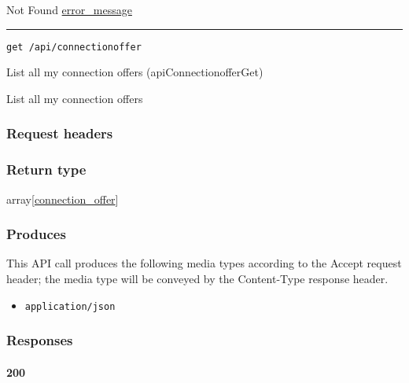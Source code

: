 Not Found \protect\hyperlink{error_message}{error\_message}

\begin{center}\rule{0.5\linewidth}{\linethickness}\end{center}

\protect\hypertarget{apiConnectionofferGet}{}{}

\begin{verbatim}
get /api/connectionoffer
\end{verbatim}

List all my connection offers ({apiConnectionofferGet})

List all my connection offers

\hypertarget{request-headers-83}{%
\subsubsection{Request headers}\label{request-headers-83}}

\hypertarget{return-type-119}{%
\subsubsection{Return type}\label{return-type-119}}

array{[}\protect\hyperlink{connection_offer}{connection\_offer}{]}

\hypertarget{produces-152}{%
\subsubsection{Produces}\label{produces-152}}

This API call produces the following media types according to the
{Accept} request header; the media type will be conveyed by the
{Content-Type} response header.

\begin{itemize}
\tightlist
\item
  \texttt{application/json}
\end{itemize}

\hypertarget{responses-157}{%
\subsubsection{Responses}\label{responses-157}}

\hypertarget{section-505}{%
\paragraph{200}\label{section-505}}

